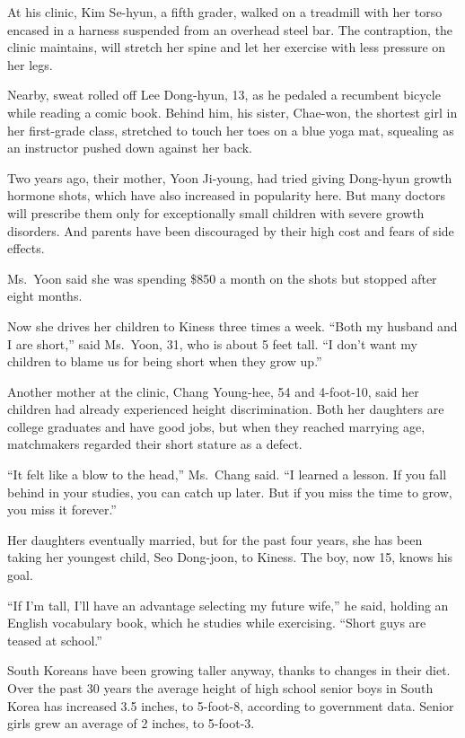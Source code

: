 ﻿\documentclass[12pt]{article}
\begin{document}
At his clinic, Kim Se-hyun, a fifth grader, walked on a treadmill with her torso encased in a
harness suspended from an overhead steel bar. The contraption, the clinic maintains, will stretch
her spine and let her exercise with less pressure on her legs.

Nearby, sweat rolled off Lee Dong-hyun, 13, as he pedaled a recumbent bicycle while reading a comic
book. Behind him, his sister, Chae-won, the shortest girl in her first-grade class, stretched to
touch her toes on a blue yoga mat, squealing as an instructor pushed down against her back.

Two years ago, their mother, Yoon Ji-young, had tried giving Dong-hyun growth hormone shots, which
have also increased in popularity here. But many doctors will prescribe them only for exceptionally
small children with severe growth disorders. And parents have been discouraged by their high cost
and fears of side effects.

Ms.~Yoon said she was spending \$850 a month on the shots but stopped after eight months.

Now she drives her children to Kiness three times a week. ``Both my husband and I are short,'' said
Ms.~Yoon, 31, who is about 5 feet tall. ``I don't want my children to blame us for being short when
they grow up.''

Another mother at the clinic, Chang Young-hee, 54 and 4-foot-10, said her children had already
experienced height discrimination. Both her daughters are college graduates and have good jobs, but
when they reached marrying age, matchmakers regarded their short stature as a defect.

``It felt like a blow to the head,'' Ms.~Chang said. ``I learned a lesson. If you fall behind in
your studies, you can catch up later. But if you miss the time to grow, you miss it forever.''

Her daughters eventually married, but for the past four years, she has been taking her youngest
child, Seo Dong-joon, to Kiness. The boy, now 15, knows his goal.

``If I'm tall, I'll have an advantage selecting my future wife,'' he said, holding an English
vocabulary book, which he studies while exercising. ``Short guys are teased at school.''

South Koreans have been growing taller anyway, thanks to changes in their diet. Over the past 30
years the average height of high school senior boys in South Korea has increased 3.5 inches, to
5-foot-8, according to government data. Senior girls grew an average of 2 inches, to 5-foot-3.
\end{document}
